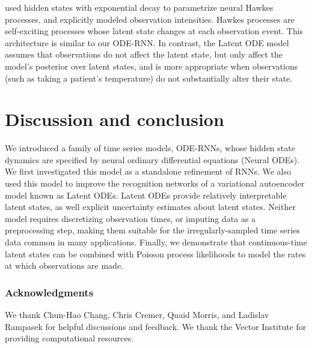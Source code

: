 \documentclass{article}
\begin{document}
\citet{neural_hawkes} used hidden states with exponential decay to parametrize neural Hawkes processes, and explicitly modeled observation intensities.
Hawkes processes are self-exciting processes whose latent state changes at each observation event.
This architecture is similar to our ODE-RNN.
In contrast, the Latent ODE model assumes that observations do not affect the latent state, but only affect the model's posterior over latent states, and is more appropriate when observations (such as taking a patient's temperature) do not substantially alter their state. 









\section{Discussion and conclusion}

We introduced a family of time series models, ODE-RNNs, whose hidden state dynamics are specified by neural ordinary differential equations (Neural ODEs).
We first investigated this model as a standalone refinement of RNNs.
We also used this model to improve the recognition networks of a variational autoencoder model known as Latent ODEs.
Latent ODEs provide relatively interpretable latent states, as well explicit uncertainty estimates about latent states.
Neither model requires discretizing observation times, or imputing data as a preprocessing step, making them suitable for the irregularly-sampled time series data common in many applications. 
Finally, we demonstrate that continuous-time latent states can be combined with Poisson process likelihoods to model the rates at which observations are made.


















\subsubsection*{Acknowledgments}

We thank Chun-Hao Chang, Chris Cremer, Quaid Morris, and Ladislav Rampasek for helpful discussions and feedback.
We thank the Vector Institute for providing computational resources.


\small {}
\end{document}

